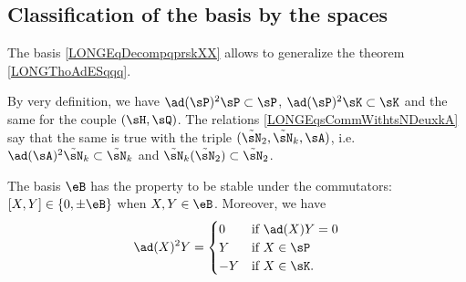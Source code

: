 %
\subsection{Classification of the basis by the spaces}
%

The basis \eqref{LONGEqDecompqprskXX} allows to generalize the theorem \ref{LONGThoAdESqqq}.

By very definition, we have $\ad(\sP)^2\sP\subset\sP$, $\ad(\sP)^2\sK\subset\sK$ and the same for the couple $(\sH,\sQ)$. The relations \eqref{LONGEqsCommWithtsNDeuxkA} say that the same is true with the triple $(\tilde\sN_2,\tilde\sN_k,\sA)$, i.e. $\ad(\sA)^2\tilde\sN_k\subset\tilde\sN_k$ and $\tilde\sN_k(\tilde\sN_2)\subset\tilde\sN_2$.

\begin{theorem}		\label{LONGThoAdSqIouZero}
	The basis $\eB$ has the property to be stable under the commutators: $[X,Y]\in\{0,\pm\eB\}$ when $X,Y\in\eB$. Moreover, we have
	\begin{equation}		\label{LONGEqadXsqYzYmY}
		\ad(X)^2Y=\begin{cases}
			0	&	\text{if $\ad(X)Y=0$}\\
			Y	&	\text{if $X\in\sP$}\\
			-Y	&	 \text{if $X\in\sK$}.
		\end{cases}
	\end{equation}
\end{theorem}

